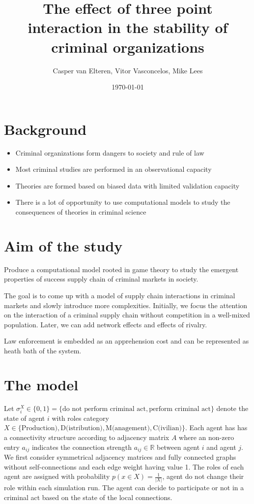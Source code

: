 \documentclass[a4paper, 11pt, twocolumn]{article}
\author{Casper van Elteren, Vitor Vasconcelos, Mike Lees}
\date{\today}
\title{The effect of three point interaction in the stability of criminal organizations}
\begin{document}
\maketitle
\tableofcontents


\section{Background}
\label{sec:org9b3ac05}
\begin{itemize}
\item Criminal organizations form dangers to society and rule of law
\item Most criminal studies are performed in an observational capacity
\item Theories  are formed  based  on biased  data with  limited
validation capacity
\item There is a lot of  opportunity to use computational models
to study the consequences of theories in criminal science
\end{itemize}

\section{Aim of the study}
\label{sec:orga60268a}
Produce a computational model rooted in game theory to study
the  emergent  properties  of   success  supply  chain  of
criminal markets in society.

The  goal  is to  come  up  with  a  model of  supply  chain
interactions in  criminal markets and slowly  introduce more
complexities.  Initially,  we  focus the  attention  on  the
interaction of  a criminal supply chain  without competition
in  a  well-mixed  population.  Later, we  can  add  network
effects and effects of rivalry.

Law enforcement is  embedded as an apprehension  cost and can
be represented as heath bath of the system.


\section{The model}
\label{sec:org9378a91}
Let \(\sigma_i^X \in \{ 0, 1  \} = \{\textrm{do not perform criminal
act}, \textrm{perform criminal act}  \}\) denote the state of
agent \(i\) with roles  category \(X \in \{ \textrm{Production)},
\textrm{D(istribution)},              \textrm{M(anagement)},
\textrm{C(ivilian)}\}\).  Each agent  has has  a connectivity
structure  according  to  adjacency   matrix  \(A\)  where  an
non-zero  entry \(a_{ij}\)  indicates the  connection strength
\(a_{ij}  \in \mathbb{R}\)  between agent  \(i\)  and agent  \(j\). We  first
consider symmetrical adjacency  matrices and fully connected
graphs without self-connections and  each edge weight having
value  1.  The  roles  of   each  agent  are  assigned  with
probability \(p(x  \in X)  = \frac{1}  {| X  |}\), agent  do not
change their role within each  simulation run. The agent can
decide to participate or not in  a criminal act based on the
state of the local connections.
\end{document}
